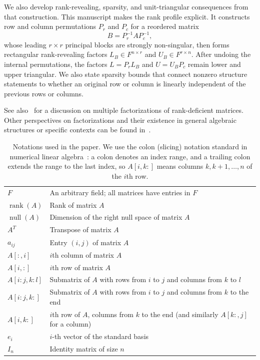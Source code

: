 \documentclass[10pt,twoside]{siamart1116}
\DeclareMathOperator{\rk}{rank}
\DeclareMathOperator{\nl}{null}
\numberwithin{theorem}{section}
\begin{document}
We also develop rank-revealing, sparsity, and unit-triangular consequences from that construction. This manuscript makes the rank profile explicit. It constructs row and column permutations \(P_r\) and \(P_c\) for a reordered matrix
\[
  B=P_r^{-1}AP_c^{-1},
\]
whose leading \(r \times r\) principal blocks are strongly non-singular, then forms rectangular rank-revealing factors \(L_B\in F^{n\times r}\) and \(U_B\in F^{r\times n}\).  After undoing the internal permutations, the factors \(L=P_rL_B\) and \(U=U_BP_c\) remain lower and upper triangular. We also state sparsity bounds that connect nonzero structure statements to whether an original row or column is linearly independent of the previous rows or columns.

See also~\cite{dopico_multiple_2006} for a discussion on multiple factorizations of rank-deficient matrices. Other perspectives on factorizations and their existence in general algebraic structures or specific contexts can be found in~\cite{nagarajan_products_1999,johnson_inherited_1989,jeffrey_lu_2010,higham_gaussian_2011}.

\begin{table}[htbp]
  \centering
  \begin{tabular}{ll}
    \toprule
    $F$          & An arbitrary field; all matrices have entries in $F$ \\
    $\rk(A)$     & Rank of matrix $A$ \\
    $\nl(A)$     & Dimension of the right null space of matrix $A$ \\
    $A^T$        & Transpose of matrix $A$ \\
    $a_{ij}$     & Entry $(i,j)$ of matrix $A$ \\
    $A[:,i]$     & $i$th column of matrix $A$ \\
    $A[i,:]$     & $i$th row of matrix $A$ \\
    $A[i:j,k:l]$ & Submatrix of $A$ with rows from $i$ to $j$ and columns from $k$ to $l$ \\
    $A[i:j,k:]$  & Submatrix of $A$ with rows from $i$ to $j$ and columns from $k$ to the end \\
    $A[i,k:]$    & $i$th row of $A$, columns from $k$ to the end (and similarly $A[k:,j]$ for a column) \\
    $e_i$        & $i$-th vector of the standard basis \\
    $I_n$        & Identity matrix of size $n$ \\
    \bottomrule
  \end{tabular}
  \vspace{5pt}
  \caption{\label{tab:notations} Notations used in the paper. We use the colon (slicing) notation standard in numerical linear algebra~\cite{golub_matrix_2013}: a colon denotes an index range, and a trailing colon extends the range to the last index, so $A[i,k:]$ means columns $k, k+1, \ldots, n$ of the $i$th row.}
\end{table}
\end{document}
